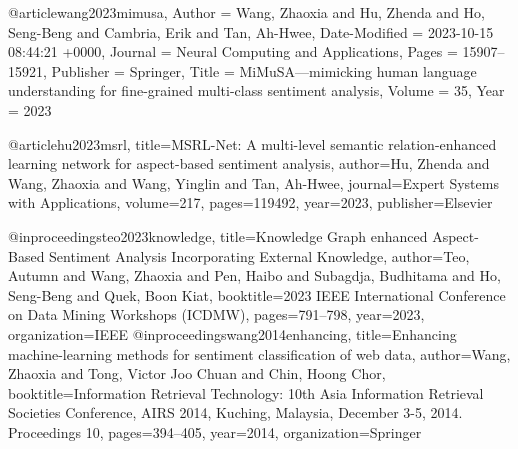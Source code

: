 @article{wang2023mimusa,
	Author = {Wang, Zhaoxia and Hu, Zhenda and Ho, Seng-Beng and Cambria, Erik and Tan, Ah-Hwee},
	Date-Modified = {2023-10-15 08:44:21 +0000},
	Journal = {Neural Computing and Applications},
	Pages = {15907--15921},
	Publisher = {Springer},
	Title = {{MiMuSA}---mimicking human language understanding for fine-grained multi-class sentiment analysis},
	Volume = {35},
	Year = {2023}}

@article{hu2023msrl,
  title={MSRL-Net: A multi-level semantic relation-enhanced learning network for aspect-based sentiment analysis},
  author={Hu, Zhenda and Wang, Zhaoxia and Wang, Yinglin and Tan, Ah-Hwee},
  journal={Expert Systems with Applications},
  volume={217},
  pages={119492},
  year={2023},
  publisher={Elsevier}
}

@inproceedings{teo2023knowledge,
  title={Knowledge Graph enhanced Aspect-Based Sentiment Analysis Incorporating External Knowledge},
  author={Teo, Autumn and Wang, Zhaoxia and Pen, Haibo and Subagdja, Budhitama and Ho, Seng-Beng and Quek, Boon Kiat},
  booktitle={2023 IEEE International Conference on Data Mining Workshops (ICDMW)},
  pages={791--798},
  year={2023},
  organization={IEEE}
}
@inproceedings{wang2014enhancing,
  title={Enhancing machine-learning methods for sentiment classification of web data},
  author={Wang, Zhaoxia and Tong, Victor Joo Chuan and Chin, Hoong Chor},
  booktitle={Information Retrieval Technology: 10th Asia Information Retrieval Societies Conference, AIRS 2014, Kuching, Malaysia, December 3-5, 2014. Proceedings 10},
  pages={394--405},
  year={2014},
  organization={Springer}
}